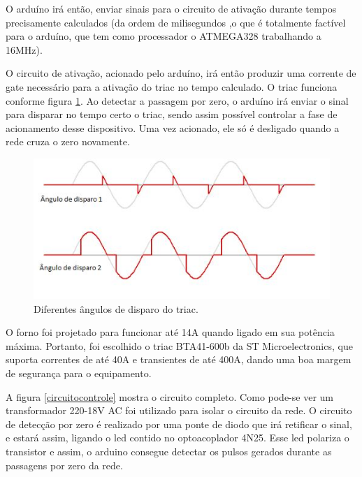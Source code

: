 O arduíno irá então, enviar sinais para o circuito de ativação durante tempos precisamente calculados (da ordem de milisegundos ,o que é totalmente factível para o arduíno, que tem como processador o ATMEGA328 trabalhando a 16MHz).

O circuito de ativação, acionado pelo arduíno, irá então produzir uma corrente de gate necessário para a ativação do triac no tempo calculado. O triac funciona conforme figura \ref{triac}. Ao detectar a passagem por zero, o arduíno irá enviar o sinal para disparar no tempo certo o triac, sendo assim possível controlar a fase de acionamento desse dispositivo. Uma vez acionado, ele só é desligado quando a rede cruza o zero novamente.

\begin{figure}[H]
	\centering
	\label{triac}
	\includegraphics[keepaspectratio=true,scale=1.0]{figuras/triac.JPG}
	\caption{Diferentes ângulos de disparo do triac.}
\end{figure}

O forno foi projetado para funcionar até 14A quando ligado em sua potência máxima. Portanto, foi escolhido o triac BTA41-600b da ST Microelectronics, que suporta correntes de até 40A e transientes de até 400A, dando uma boa margem de segurança para o equipamento.

A figura \ref{circuitocontrole} mostra o circuito completo. Como pode-se ver um transformador 220-18V AC foi utilizado para isolar o circuito da rede. O circuito de detecção por zero é realizado por uma ponte de diodo que irá retificar o sinal, e estará assim, ligando o led contido no optoacoplador 4N25. Esse led polariza o transistor e assim, o arduino consegue detectar os pulsos gerados durante as passagens por zero da rede.


